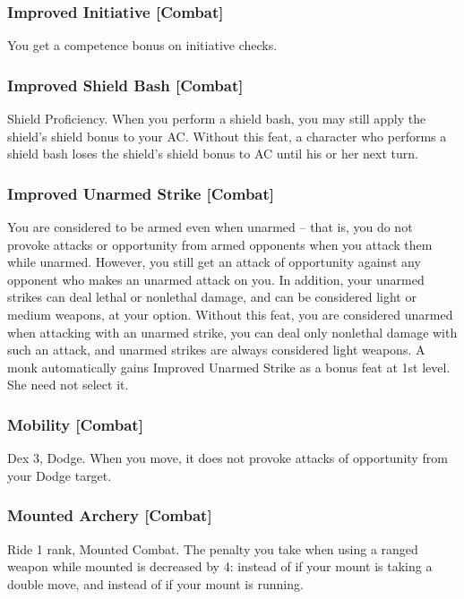 \subsubsection{Improved Initiative [Combat]}
 You get a  competence bonus on initiative checks.

\subsubsection{Improved Shield Bash [Combat]}
 Shield Proficiency.
 When you perform a shield bash, you may still apply the shield's shield bonus to your AC.
 Without this feat, a character who performs a shield bash loses the shield's shield bonus to AC until his or her next turn.%

\subsubsection{Improved Unarmed Strike [Combat]}
 You are considered to be armed even when unarmed -- that is, you do not provoke attacks or opportunity from armed opponents when you attack them while unarmed. However, you still get an attack of opportunity against any opponent who makes an unarmed attack on you.
In addition, your unarmed strikes can deal lethal or nonlethal damage, and can be considered light or medium weapons, at your option.
 Without this feat, you are considered unarmed when attacking with an unarmed strike, you can deal only nonlethal damage with such an attack, and unarmed strikes are always considered light weapons.
 A monk automatically gains Improved Unarmed Strike as a bonus feat at 1st level. She need not select it.

\subsubsection{Mobility [Combat]}
 Dex 3, Dodge.
 When you move, it does not provoke attacks of opportunity from your Dodge target.

\subsubsection{Mounted Archery [Combat]}
 Ride 1 rank, Mounted Combat.
 The penalty you take when using a ranged weapon while mounted is decreased by 4:  instead of  if your mount is taking a double move, and  instead of  if your mount is running.

